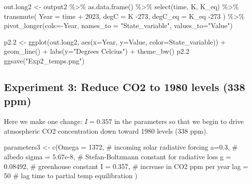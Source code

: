 \documentclass[
  letterpaper,
  DIV=11,
  numbers=noendperiod]{scrreprt}
\newenvironment{Shaded}{\begin{snugshade}}{\end{snugshade}}
\newcommand{\AttributeTok}[1]{\textcolor[rgb]{0.40,0.45,0.13}{#1}}
\newcommand{\CommentTok}[1]{\textcolor[rgb]{0.37,0.37,0.37}{#1}}
\newcommand{\DecValTok}[1]{\textcolor[rgb]{0.68,0.00,0.00}{#1}}
\newcommand{\FloatTok}[1]{\textcolor[rgb]{0.68,0.00,0.00}{#1}}
\newcommand{\FunctionTok}[1]{\textcolor[rgb]{0.28,0.35,0.67}{#1}}
\newcommand{\NormalTok}[1]{\textcolor[rgb]{0.00,0.23,0.31}{#1}}
\newcommand{\OtherTok}[1]{\textcolor[rgb]{0.00,0.23,0.31}{#1}}
\newcommand{\SpecialCharTok}[1]{\textcolor[rgb]{0.37,0.37,0.37}{#1}}
\newcommand{\StringTok}[1]{\textcolor[rgb]{0.13,0.47,0.30}{#1}}
\begin{document}
\begin{Shaded}
\begin{Highlighting}[]
\NormalTok{out.long2 }\OtherTok{\textless{}{-}}\NormalTok{ output2 }\SpecialCharTok{\%\textgreater{}\%} \FunctionTok{as.data.frame}\NormalTok{() }\SpecialCharTok{\%\textgreater{}\%}
  \FunctionTok{select}\NormalTok{(time, K, K\_eq) }\SpecialCharTok{\%\textgreater{}\%}
  \FunctionTok{transmute}\NormalTok{(}
    \AttributeTok{Year =}\NormalTok{ time }\SpecialCharTok{+} \DecValTok{2023}\NormalTok{,}
    \AttributeTok{degC =}\NormalTok{ K }\SpecialCharTok{{-}}\DecValTok{273}\NormalTok{,}
    \AttributeTok{degC\_eq =}\NormalTok{ K\_eq }\SpecialCharTok{{-}}\DecValTok{273}
\NormalTok{  ) }\SpecialCharTok{\%\textgreater{}\%}
  \FunctionTok{pivot\_longer}\NormalTok{(}\AttributeTok{cols=}\SpecialCharTok{{-}}\NormalTok{Year, }\AttributeTok{names\_to =} \StringTok{"State\_variable"}\NormalTok{, }
               \AttributeTok{values\_to=}\StringTok{"Value"}\NormalTok{)}

\NormalTok{p2}\FloatTok{.2} \OtherTok{\textless{}{-}} \FunctionTok{ggplot}\NormalTok{(out.long2, }\FunctionTok{aes}\NormalTok{(}\AttributeTok{x=}\NormalTok{Year, }\AttributeTok{y=}\NormalTok{Value, }\AttributeTok{color=}\NormalTok{State\_variable)) }\SpecialCharTok{+} 
  \FunctionTok{geom\_line}\NormalTok{() }\SpecialCharTok{+} 
  \FunctionTok{labs}\NormalTok{(}\AttributeTok{y=}\StringTok{"Degrees Celcius"}\NormalTok{)  }\SpecialCharTok{+}
  \FunctionTok{theme\_bw}\NormalTok{()}
\NormalTok{p2}\FloatTok{.2}
\FunctionTok{ggsave}\NormalTok{(}\StringTok{"Exp2\_temps.png"}\NormalTok{)}
\end{Highlighting}
\end{Shaded}

\subsection{Experiment 3: Reduce CO2 to 1980 levels (338
ppm)}\label{experiment-3-reduce-co2-to-1980-levels-338-ppm}

Here we make one change: \(I=0.357\) in the parameters so that we begin
to drive atmospheric CO2 concentration down toward 1980 levels (338
ppm).

\begin{Shaded}
\begin{Highlighting}[]
\NormalTok{parameters3 }\OtherTok{\textless{}{-}} \FunctionTok{c}\NormalTok{(}\AttributeTok{Omega =} \DecValTok{1372}\NormalTok{, }\CommentTok{\# incoming solar radiative forcing}
       \AttributeTok{a=}\FloatTok{0.3}\NormalTok{, }\CommentTok{\# albedo}
       \AttributeTok{sigma =} \FloatTok{5.67e{-}8}\NormalTok{, }\CommentTok{\# Stefan{-}Boltzmann constant for radiative loss}
       \AttributeTok{g =} \FloatTok{0.08492}\NormalTok{, }\CommentTok{\# greenhouse constant}
       \AttributeTok{I =} \FloatTok{0.357}\NormalTok{, }\CommentTok{\# increase in CO2 ppm per year}
       \AttributeTok{lag =} \DecValTok{50} \CommentTok{\# lag time to partial temp equilibration}
\NormalTok{)}
\end{Highlighting}
\end{Shaded}
\end{document}
